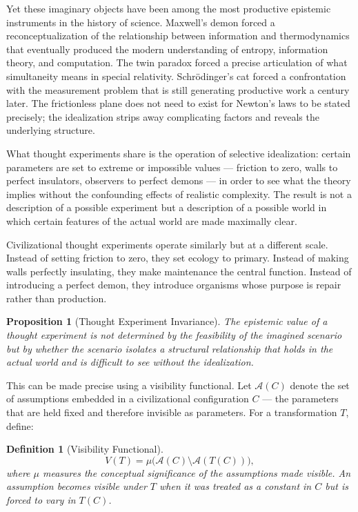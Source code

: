 \documentclass[12pt, a4paper]{article}
\theoremstyle{named}
\newtheorem{proposition}{Proposition}
\newtheorem{definition}{Definition}
\begin{document}
Yet these imaginary objects have been among the most productive epistemic
instruments in the history of science. Maxwell's demon forced a
reconceptualization of the relationship between information and
thermodynamics that eventually produced the modern understanding of
entropy, information theory, and computation. The twin paradox forced a
precise articulation of what simultaneity means in special relativity.
Schrödinger's cat forced a confrontation with the measurement problem
that is still generating productive work a century later. The
frictionless plane does not need to exist for Newton's laws to be stated
precisely; the idealization strips away complicating factors and reveals
the underlying structure.

What thought experiments share is the operation of selective idealization:
certain parameters are set to extreme or impossible values — friction to
zero, walls to perfect insulators, observers to perfect demons — in order
to see what the theory implies without the confounding effects of
realistic complexity. The result is not a description of a possible
experiment but a description of a possible world in which certain
features of the actual world are made maximally clear.

Civilizational thought experiments operate similarly but at a different
scale. Instead of setting friction to zero, they set ecology to primary.
Instead of making walls perfectly insulating, they make maintenance the
central function. Instead of introducing a perfect demon, they
introduce organisms whose purpose is repair rather than production.

\begin{proposition}[Thought Experiment Invariance]
The epistemic value of a thought experiment is not determined by the
feasibility of the imagined scenario but by whether the scenario
isolates a structural relationship that holds in the actual world and
is difficult to see without the idealization.
\end{proposition}

This can be made precise using a visibility functional. Let
$\mathcal{A}(C)$ denote the set of assumptions embedded in a
civilizational configuration $C$ — the parameters that are held fixed
and therefore invisible as parameters. For a transformation $T$, define:

\begin{definition}[Visibility Functional]
\[
  V(T) = \mu\!\bigl(\mathcal{A}(C) \setminus \mathcal{A}(T(C))\bigr),
\]
where $\mu$ measures the conceptual significance of the assumptions
made visible. An assumption becomes visible under $T$ when it was
treated as a constant in $C$ but is forced to vary in $T(C)$.
\end{definition}
\end{document}
